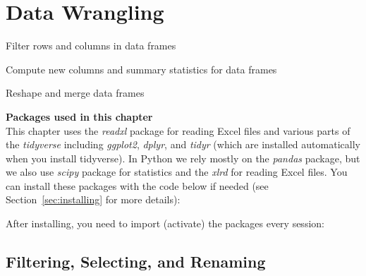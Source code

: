 \chapter{Data Wrangling}
\label{chap:datawrangling}

\begin{abstract}{Abstract}
This chapter shows you how to do ``data wrangling'' in R and Python.
Data wrangling is the process of transforming raw data into a shape that is suitable for analysis. The sections of this chapter first take you through the normal data wrangling pipeline of
filtering, changing, grouping, and joining data. Finally, the last section shows how you can
reshape data.
\end{abstract}


\begin{objectives}
\item Filter rows and columns in data frames
\item Compute new columns and summary statistics for data frames
\item Reshape and merge data frames
\end{objectives}

\newpage
\begin{feature}
  \textbf{Packages used in this chapter}\\
  This chapter uses the \emph{readxl} package for reading Excel files and various parts of the \emph{tidyverse} including \emph{ggplot2}, \emph{dplyr}, and \emph{tidyr} (which are installed automatically when you install tidyverse). In Python we rely mostly on the \emph{pandas} package, but we also use \emph{scipy} package for statistics and the \emph{xlrd} for reading Excel files. You can install these packages with the code below if needed
  (see Section~\ref{sec:installing} for more details):


\noindent After installing, you need to import (activate) the packages every session:


\end{feature}

\section{Filtering, Selecting, and Renaming}


